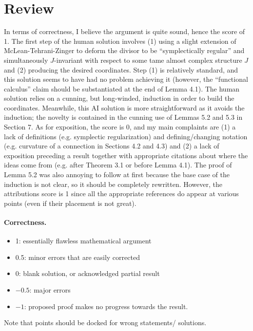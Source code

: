 \documentclass[11pt]{article}
\theoremstyle{definition}
\theoremstyle{remark}
\begin{document}
\maketitle

\section{Review}
In terms of correctness, I believe the argument is quite sound, hence the score of 1. The first step of the human solution involves (1) using a slight extension of McLean-Tehrani-Zinger to deform the divisor to be ``symplectically regular'' and simultaneously $J$-invariant with respect to some tame almost complex structure $J$ and (2) producing the desired coordinates. Step (1) is relatively standard, and this solution seems to have had no problem achieving it (however, the ``functional calculus'' claim should be substantiated at the end of Lemma 4.1). The human solution relies on a cunning, but long-winded, induction in order to build the coordinates. Meanwhile, this AI solution is more straightforward as it avoids the induction; the novelty is contained in the cunning use of Lemmas 5.2 and 5.3 in Section 7. As for exposition, the score is 0, and my main complaints are (1) a lack of definitions (e.g. symplectic regularization) and defining/changing notation (e.g. curvature of a connection in Sections 4.2 and 4.3) and (2) a lack of exposition preceding a result together with appropriate citations about where the ideas come from (e.g. after Theorem 3.1 or before Lemma 4.1). The proof of Lemma 5.2 was also annoying to follow at first because the base case of the induction is not clear, so it should be completely rewritten. However, the attributions score is 1 since all the appropriate references do appear at various points (even if their placement is not great).

\paragraph{Correctness.}
\begin{itemize}
	\item  1: essentially flawless mathematical argument
	\item  0.5: minor errors that are easily corrected
	\item  0: blank solution, or acknowledged partial result
	\item  $-0.5$: major errors
	\item  $-1$: proposed proof makes no progress towards the result.
\end{itemize}
Note that points should be docked for wrong statements/ solutions.
\end{document}
